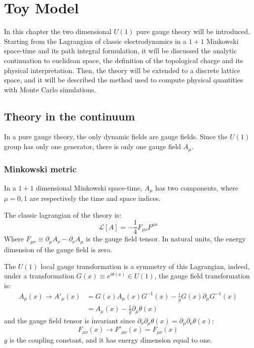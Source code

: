 \chapter{Toy Model}\label{ch:toy_model}

In this chapter the two dimensional $U(1)$ pure gauge theory will be introduced.
Starting from the Lagrangian of classic electrodynamics in a $1+1$ Minkowski space-time and its path integral formulation,
it will be discussed the analytic continuation to euclidean space, the definition of the topological charge and its physical interpretation.
Then, the theory will be extended to a discrete lattice space, and it will be described the method used to compute physical quantities with Monte Carlo simulations.


\section{Theory in the continuum}

In a pure gauge theory, the only dynamic fields are gauge fields.
Since the $U(1)$ group has only one generator, there is only one gauge field $A_\mu$.

\subsection*{Minkowski metric}

In a $1+1$ dimensional Minkowski space-time, $A_\mu$ has two components, where $\mu = 0, 1$ are respectively the time and space indices.

The classic lagrangian of the theory is:
\[
    \mathcal L[A] = -\frac{1}{4} F_{\mu\nu}F^{\mu\nu}
\]
Where $F_{\mu\nu} \equiv \partial_\mu A_\nu - \partial_\nu A_\mu$ is the gauge field tensor.
In natural units, the energy dimension of the gauge field is zero.

The $U(1)$ local gauge transformation is a symmetry of this Lagrangian, indeed,
under a transformation $G(x) \equiv e^{i\theta(x)} \in U(1)$,
the gauge field transformation is:
\begin{align*}
    A_\mu(x) \rightarrow A'_\mu(x) &= G(x) A_\mu(x) G^{-1}(x) - \frac{i}{g} G(x) \partial_\mu G^{-1}(x) \\
                                   &= A_\mu(x) - \frac{1}{g} \partial_\mu \theta(x)
\end{align*}
and the gauge field tensor is invariant since $\partial_\nu\partial_\mu\theta(x) = \partial_\mu\partial_\nu\theta(x)$:
\[
    F_{\mu\nu}(x) \rightarrow F'_{\mu\nu}(x) = F_{\mu\nu}(x)
\]
$g$ is the coupling constant, and it has energy dimension equal to one.

